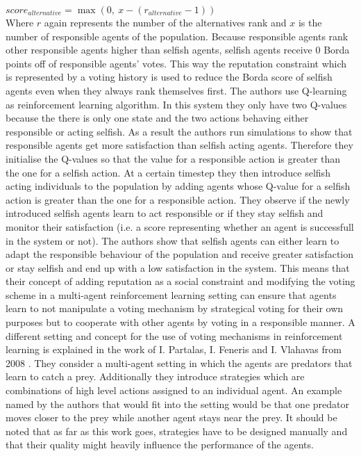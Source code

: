 \documentclass[conference]{IEEEtran}
\begin{document}
$score_{alternative}=\max(0,\ x-(r_{alternative}-1))$\\
Where $r$ again represents the number of the alternatives rank and $x$ is the number of responsible agents of the population. Because responsible agents rank other responsible agents higher than selfish agents, selfish agents receive $0$ Borda points off of responsible agents' votes. This way the reputation constraint which is represented by a voting history is used to reduce the Borda score of selfish agents even when they always rank themselves first.
\newline
The authors use Q-learning as reinforcement learning algorithm. In this system they only have two Q-values because the there is only one state and the two actions behaving either responsible or acting selfish.
As a result the authors run simulations to show that responsible agents get more satisfaction than selfish acting agents. Therefore they initialise the Q-values so that the value for a responsible action is greater than the one for a selfish action. At a certain timestep they then introduce selfish acting individuals to the population by adding agents whose Q-value for a selfish action is greater than the one for a responsible action. They observe if the newly introduced selfish agents learn to act responsible or if they stay selfish and monitor their satisfaction (i.e. a score representing whether an agent is successfull in the system or not).
\newline
The authors show that selfish agents can either learn to adapt the responsible behaviour of the population and receive greater satisfaction or stay selfish and end up with a low satisfaction in the system. This means that their concept of adding reputation as a social constraint and modifying the voting scheme in a multi-agent reinforcement learning setting can ensure that agents learn to not manipulate a voting mechanism by strategical voting for their own purposes but to cooperate with other agents by voting in a responsible manner.
\newline
\newline
A different setting and concept for the use of voting mechanisms in reinforcement learning is explained in the work of I. Partalas, I. Feneris and I. Vlahavas from 2008 \cite{partalas2008hybrid}. They consider a multi-agent setting in which the agents are predators that learn to catch a prey.
\newline
Additionally they introduce strategies which are combinations of high level actions assigned to an individual agent. An example named by the authors that would fit into the setting would be that one predator moves closer to the prey while another agent stays near the prey. It should be noted that as far as this work goes, strategies have to be designed manually and that their quality might heavily influence the performance of the agents.
\end{document}
